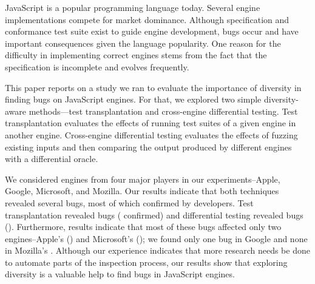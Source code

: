 JavaScript is a popular programming language today. Several engine
implementations compete for market dominance. Although specification
and conformance test suite exist to guide engine development, bugs
occur and have important consequences given the language
popularity. One reason for the difficulty in implementing correct
engines stems from the fact that the specification is incomplete and
evolves frequently.

This paper reports on a study we ran to evaluate the importance of
diversity in finding bugs on JavaScript engines. For that, we explored two
simple diversity-aware methods---test transplantation and cross-engine
differential testing. Test transplantation evaluates the effects of
running test suites of a given engine in another engine. Cross-engine
differential testing evaluates the effects of fuzzing existing inputs
and then comparing the output produced by different engines with a
differential oracle.

We considered engines from four major players in our
experiments--Apple, Google, Microsoft, and Mozilla. Our results
indicate that both techniques revealed several bugs, most of which
confirmed by developers. Test transplantation
revealed \noBugsTransplantation{} bugs
(\noBugsTransplantationConfirmed{} confirmed) and differential testing
revealed \noBugsDifferentialTesting{} bugs
(\noBugsDifferentialTestingConfirmed{}). Furthermore, results indicate
that most of these bugs affected only two engines--Apple's
\jsc{} (\percJSC{}) and Microsoft's \chakra{} (\percChakra{}); we found
only one bug in Google \veight{} and none in Mozilla's
\smonkey{}. Although our experience indicates that more research needs
be done to automate parts of the inspection process, our results show
that exploring diversity is a valuable help to find bugs in JavaScript
engines.
